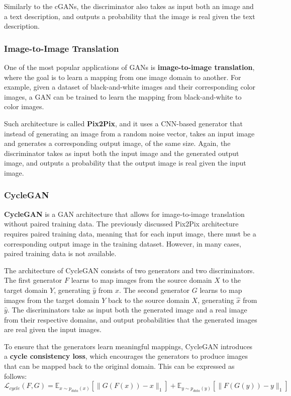 Similarly to the cGANs, the discriminator also takes as input both an image and a text description, and outputs a probability that the image is real given the text description.

\subsubsection{Image-to-Image Translation}
One of the most popular applications of GANs is \textbf{image-to-image translation}, where the goal is to learn a mapping from one image domain to another.
For example, given a dataset of black-and-white images and their corresponding color images, a GAN can be trained to learn the mapping from black-and-white to color images.

Such architecture is called \textbf{Pix2Pix}, and it uses a CNN-based generator that instead of generating an image from a random noise vector, takes an input image and generates a corresponding output image,
of the same size.
Again, the discriminator takes as input both the input image and the generated output image, and outputs a probability that the output image is real given the input image.

\subsubsection{CycleGAN}
\textbf{CycleGAN} is a GAN architecture that allows for image-to-image translation without paired training data. The previously discussed Pix2Pix architecture requires paired training data,
meaning that for each input image, there must be a corresponding output image in the training dataset.
However, in many cases, paired training data is not available.

The architecture of CycleGAN consists of two generators and two discriminators. 
The first generator $F$ learns to map images from the source domain $X$ to the target domain $Y$, generating $\hat{y}$ from $x$.
The second generator $G$ learns to map images from the target domain $Y$ back to the source domain $X$, generating $\hat{x}$ from $\hat{y}$.
The discriminators take as input both the generated image and a real image from their respective domains, and output probabilities that the generated images are real given the input images.

To ensure that the generators learn meaningful mappings, CycleGAN introduces a \textbf{cycle consistency loss}, which encourages the generators to produce images that can be mapped back to the original domain.
This can be expressed as follows:
\begin{equation}
    \mathcal{L}_{cycle}(F, G) = \mathbb{E}_{x \sim p_{data}(x)}[\|G(F(x)) - x\|_1] + \mathbb{E}_{y \sim p_{data}(y)}[\|F(G(y)) - y\|_1]
\end{equation}


